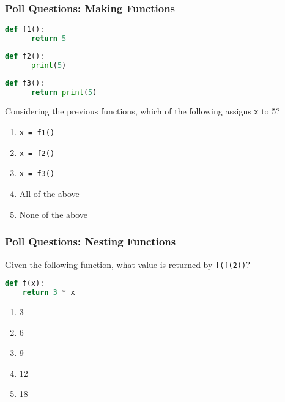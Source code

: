\documentclass{beamer}
\begin{document}
%
%
\begin{frame}[fragile]
  \frametitle{Poll Questions: Making Functions}
  \begin{minipage}{0.29\textwidth}
    \centering
    \begin{lstlisting}[language=Python, autogobble]
    def f1():
      return 5
    \end{lstlisting}
  \end{minipage}
  \hfill
  \begin{minipage}{0.29\textwidth}
    \centering
    \begin{lstlisting}[language=Python, autogobble]
    def f2():
      print(5)
    \end{lstlisting}
  \end{minipage}
  \hfill
  \begin{minipage}{0.29\textwidth}
    \centering
    \begin{lstlisting}[language=Python, autogobble]
    def f3():
      return print(5)
    \end{lstlisting}
  \end{minipage}
  \vfill
  Considering the previous functions, which of the following assigns \lstinline|x| to 5?
  \centering
  \begin{enumerate}[A]
    \item \lstinline|x = f1()|
    \item \lstinline|x = f2()|
    \item \lstinline|x = f3()|
    \item All of the above
    \item None of the above
  \end{enumerate}
\end{frame}

%
%
\begin{frame}[fragile]
  \frametitle{Poll Questions: Nesting Functions}
  Given the following function, what value is returned by \lstinline|f(f(2))|?
  \begin{lstlisting}[language=Python, autogobble]
  def f(x):
    return 3 * x
  \end{lstlisting}
  \vfill
  \begin{enumerate}[A]
    \item 3
    \item 6
    \item 9
    \item 12
    \item 18
  \end{enumerate}
\end{frame}
\end{document}
